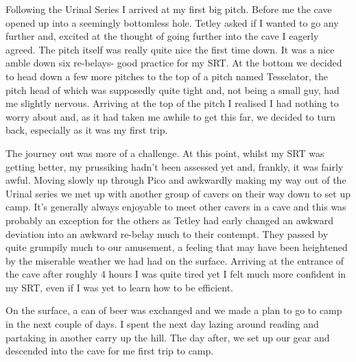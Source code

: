Following the Urinal Series I arrived at my first big pitch. Before me
the cave opened up into a seemingly bottomless hole. Tetley asked if I
wanted to go any further and, excited at the thought of going further
into the cave I eagerly agreed. The pitch itself was really quite nice
the first time down. It was a nice amble down six re-belays- good
practice for my SRT. At the bottom we decided to head down a few more
pitches to the top of a pitch named Tesselator, the pitch head of which
was supposedly quite tight and, not being a small guy, had me slightly
nervous. Arriving at the top of the pitch I realised I had nothing to
worry about and, as it had taken me awhile to get this far, we decided
to turn back, especially as it was my first trip.

The journey out was more of a challenge. At this point, whilst my SRT
was getting better, my prussiking hadn't been assessed yet and, frankly,
it was fairly awful. Moving slowly up through Pico and awkwardly making
my way out of the Urinal series we met up with another group of cavers
on their way down to set up camp. It's generally always enjoyable to
meet other cavers in a cave and this was probably an exception for the
others as Tetley had early changed an awkward deviation into an awkward
re-belay much to their contempt. They passed by quite grumpily much to
our amusement, a feeling that may have been heightened by the miserable
weather we had had on the surface. Arriving at the entrance of the cave
after roughly 4 hours I was quite tired yet I felt much more confident
in my SRT, even if I was yet to learn how to be efficient.

On the surface, a can of beer was exchanged and we made a plan to go to
camp in the next couple of days. I spent the next day lazing around
reading and partaking in another carry up the hill. The day after, we
set up our gear and descended into the cave for me first trip to camp.

